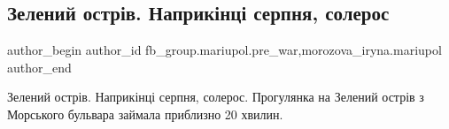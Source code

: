  
 
 
 
 

\subsection{Зелений острів. Наприкінці серпня, солерос}
\label{sec:25_02_2023.fb.fb_group.mariupol.pre_war.1.zelenii_ostr_v__napr}
 
\ifcmt
 author_begin
   author_id fb_group.mariupol.pre_war,morozova_iryna.mariupol
 author_end
\fi

Зелений острів. Наприкінці серпня, солерос. Прогулянка на Зелений острів з
Морського бульвара займала приблизно 20 хвилин.
